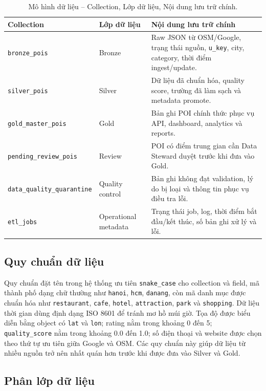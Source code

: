 \documentclass[12pt,a4paper]{article}
\begin{document}
\begin{longtable}{@{}p{}p{}p{}@{}}
\caption{Mô hình dữ liệu -- Collection, Lớp dữ liệu, Nội dung lưu trữ chính.}\\
\toprule
\textbf{Collection} & \textbf{Lớp dữ liệu} & \textbf{Nội dung lưu trữ chính} \\
\midrule
\texttt{bronze\_pois} & Bronze & Raw JSON từ OSM/Google, trạng thái nguồn, \texttt{u\_key}, city, category, thời điểm ingest/update. \\
\texttt{silver\_pois} & Silver & Dữ liệu đã chuẩn hóa, quality score, trường đã làm sạch và metadata promote. \\
\texttt{gold\_master\_pois} & Gold & Bản ghi POI chính thức phục vụ API, dashboard, analytics và reports. \\
\texttt{pending\_review\_pois} & Review & POI có điểm trung gian cần Data Steward duyệt trước khi đưa vào Gold. \\
\texttt{data\_quality\_quarantine} & Quality control & Bản ghi không đạt validation, lý do bị loại và thông tin phục vụ điều tra lỗi. \\
\texttt{etl\_jobs} & Operational metadata & Trạng thái job, log, thời điểm bắt đầu/kết thúc, số bản ghi xử lý và lỗi. \\
\bottomrule
\end{longtable}

\subsection{Quy chuẩn dữ liệu}

Quy chuẩn đặt tên trong hệ thống ưu tiên \texttt{snake\_case} cho collection và field, mã thành phố dạng chữ thường như \texttt{hanoi}, \texttt{hcm}, \texttt{danang}, còn mã danh mục được chuẩn hóa như \texttt{restaurant}, \texttt{cafe}, \texttt{hotel}, \texttt{attraction}, \texttt{park} và \texttt{shopping}. Dữ liệu thời gian dùng định dạng ISO 8601 để tránh mơ hồ múi giờ. Tọa độ được biểu diễn bằng object có \texttt{lat} và \texttt{lon}; rating nằm trong khoảng 0 đến 5; \texttt{quality\_score} nằm trong khoảng 0.0 đến 1.0; số điện thoại và website được chọn theo thứ tự ưu tiên giữa Google và OSM. Các quy chuẩn này giúp dữ liệu từ nhiều nguồn trở nên nhất quán hơn trước khi được đưa vào Silver và Gold.

\subsection{Phân lớp dữ liệu}
\end{document}
